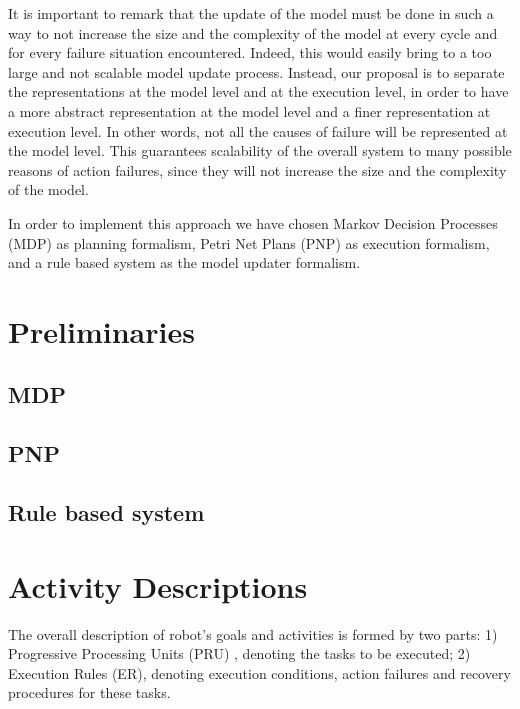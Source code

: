 It is important to remark that the update of the model must be done in such a way to not increase the size and the complexity of the model at every cycle and for every failure situation encountered. Indeed, this would easily bring to a too large and not scalable model update process. Instead, our proposal is to separate the representations at the model level and at the execution level, in order to have a more abstract representation at the model level and a finer representation at execution level.
In other words, not all the causes of failure will be represented at the model level. This guarantees scalability of the overall system to many possible reasons of action failures,
since they will not increase the size and the complexity of the model.

In order to implement this approach we have chosen Markov Decision Processes (MDP) as planning formalism, Petri Net Plans (PNP) as execution formalism, and a rule based system as the model updater formalism.

\section{Preliminaries}

\subsection{MDP}

\subsection{PNP}

\subsection{Rule based system}

\section{Activity Descriptions}

The overall description of robot's goals and activities is formed by two parts:
1) Progressive Processing Units (PRU) \cite{CaMoZi01}, denoting the tasks to be executed;
2) Execution Rules (ER), denoting execution conditions, action failures and recovery procedures for these tasks.

